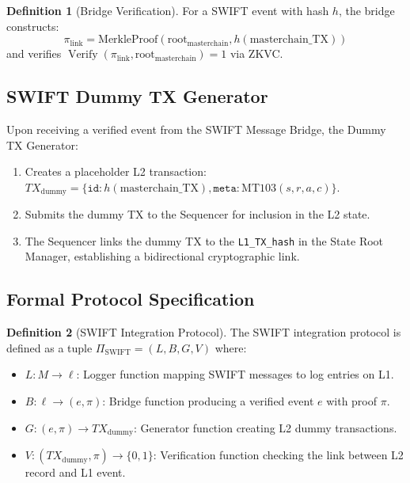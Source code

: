 \documentclass[12pt,a4paper]{article}
\theoremstyle{definition}
\newtheorem{definition}{Definition}[section]
\theoremstyle{remark}
\DeclareMathOperator{\Verify}{Verify}
\begin{document}
\begin{definition}[Bridge Verification]
For a SWIFT event with hash $h$, the bridge constructs:
\begin{equation}
\pi_{\text{link}} = \text{MerkleProof}(\text{root}_{\text{masterchain}}, h(\text{masterchain\_TX}))
\end{equation}
and verifies $\Verify(\pi_{\text{link}}, \text{root}_{\text{masterchain}}) = 1$ via ZKVC.
\end{definition}

\subsection{SWIFT Dummy TX Generator}

Upon receiving a verified event from the SWIFT Message Bridge, the Dummy TX Generator:

\begin{enumerate}[nosep]
    \item Creates a placeholder L2 transaction: $TX_{\text{dummy}} = \{\texttt{id}: h(\text{masterchain\_TX}), \texttt{meta}: \text{MT103}(s,r,a,c)\}$.
    \item Submits the dummy TX to the Sequencer for inclusion in the L2 state.
    \item The Sequencer links the dummy TX to the \texttt{L1\_TX\_hash} in the State Root Manager, establishing a bidirectional cryptographic link.
\end{enumerate}

\subsection{Formal Protocol Specification}

\begin{definition}[SWIFT Integration Protocol]
The SWIFT integration protocol is defined as a tuple $\Pi_{\text{SWIFT}} = (L, B, G, V)$ where:
\begin{itemize}[nosep]
    \item $L: M \to \ell$: Logger function mapping SWIFT messages to log entries on L1.
    \item $B: \ell \to (e, \pi)$: Bridge function producing a verified event $e$ with proof $\pi$.
    \item $G: (e, \pi) \to TX_{\text{dummy}}$: Generator function creating L2 dummy transactions.
    \item $V: (TX_{\text{dummy}}, \pi) \to \{0,1\}$: Verification function checking the link between L2 record and L1 event.
\end{itemize}
\end{definition}
\end{document}

